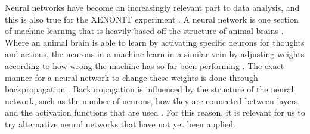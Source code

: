 \documentclass[thesis.tex]{subfiles}
\begin{document}
Neural networks have become an increasingly relevant part to data analysis, and this is also true for the XENON1T experiment \cite{Bart}.
A neural network is one section of machine learning that is heavily based off the structure of animal brains \cite{deep-learning}.
Where an animal brain is able to learn by activating specific neurons for thoughts and actions, the neurons in a machine learn in a similar vein by adjusting weights according to how wrong the machine has so far been performing \cite{deep-learning}.
The exact manner for a neural network to change these weights is done through backpropagation \cite{deep-learning}.
Backpropagation is influenced by the structure of the neural network, such as the number of neurons, how they are connected between layers, and the activation functions that are used \cite{deep-learning}.
For this reason, it is relevant for us to try alternative neural networks that have not yet been applied.
\end{document}
